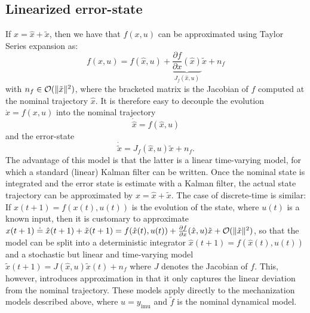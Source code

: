 \documentclass[]{article}
\def\imu{_\mathrm{imu}}
\begin{document}
{\subsection{Linearized error-state}
%
If $x = \hat x + \tilde x$, then we have that $f(x,u)$ can be approximated using Taylor Series expansion as:
\begin{equation}
f(x, u)  = f(\hat x, u) + \underbrace{\frac{\partial f}{\partial x}(\hat x)}_{J_f(\hat x,u)}\tilde x + n_f
\end{equation}
with $n_f \in {\cal O}(\| \tilde x\|^2)$, where the bracketed matrix is the Jacobian of $f$ computed at the nominal trajectory $\hat x$. It is therefore easy to decouple the evolution $\dot x = f(x, u)$ into the nominal trajectory
\begin{equation}
\dot {\hat x} = f(\hat x, u)
\end{equation}
and the error-state
\begin{equation}
\dot{\tilde x} = J_f(\hat x,u) \tilde x + n_f.
\end{equation}
The advantage of this model is that the latter is a linear time-varying model, for which a standard (linear) Kalman filter can be written. Once the nominal state is integrated and the error state is estimate with a Kalman filter, the actual state trajectory can be approximated by $x = \hat x + \tilde x$.
%
The case of discrete-time is similar: If $x(t+1) = f(x(t), u(t))$ is the evolution of the state, where $u(t)$ is a known input, then it is customary to approximate $x(t+1) \doteq \hat x(t+1) + \tilde x(t+1) = f(\hat x(t), u(t)) + \frac{\partial f}{\partial x}(\hat x,u) \tilde x + {\cal O}(\| \tilde x \|^2)$, so that the model can be split into a deterministic integrator $\hat x(t+1) = f(\hat x(t), u(t))$ and a stochastic but linear and time-varying model $\tilde x(t+1) = J(\hat x,u)\tilde x(t) + n_f$ where $J$ denotes the Jacobian of $f$. This, however, introduces approximation in that it only captures the linear deviation from the nominal trajectory. 
%
These models apply directly to the mechanization models described above, where $u = y\imu $ and $\tilde f$ is the nominal dynamical model. 
%
}
\end{document}
